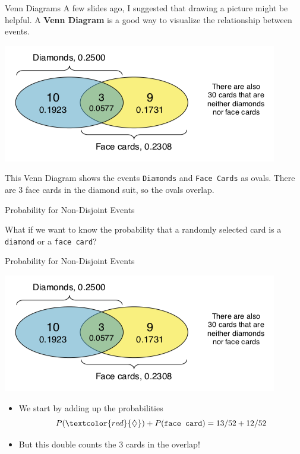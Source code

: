 \begin{frame}{Venn Diagrams}
    A few slides ago, I suggested that drawing a picture might be helpful. A \textbf{Venn Diagram} is a good way to visualize the relationship between events.
    \begin{center}
        \includegraphics[scale=0.5]{images/venndiagram.png}
    \end{center}
    This Venn Diagram shows the events \texttt{Diamonds} and \texttt{Face Cards} as ovals. There are 3 face cards in the diamond suit, so the ovals overlap.
\end{frame}

\begin{frame}{Probability for Non-Disjoint Events}

    What if we want to know the probability that a randomly selected card is a \texttt{diamond} or a \texttt{face card}?

\end{frame}

\begin{frame}{Probability for Non-Disjoint Events}
    \begin{center}
        \includegraphics[scale=0.4]{images/venndiagram.png}
    \end{center}
    \begin{itemize}
        \item We start by adding up the probabilities
        \[
        P(\textcolor{red}{\diamondsuit})+P(\texttt{face card})=13/52 + 12/52
        \]
        \item But this double counts the 3 cards in the overlap!
    \end{itemize}
\end{frame}

